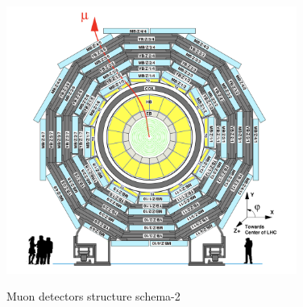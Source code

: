 			\begin{figure}[H]
			\centering{}
		    	\includegraphics[width=0.85\textwidth]{Figures/ExpApparatus/muon_chamber2.png}\\
			\caption{Muon detectors structure schema-2\cite{Chatrchyan:2008aa}}
			\label{ExpApp:fig:muon_chamber2}
			\end{figure}
			\FloatBarrier





